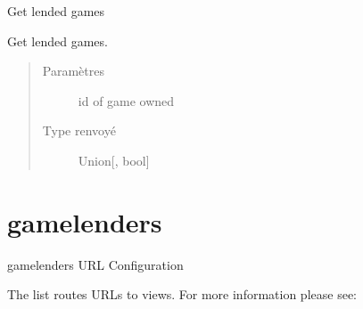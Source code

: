 \documentclass[letterpaper,10pt,french]{sphinxmanual}
\begin{document}
\label{\detokenize{library:module-library.templatetags.get_lended}}
Get lended games

\begin{fulllineitems}
\label{\detokenize{library:library.templatetags.get_lended.get_lended}}
Get lended games.
\begin{quote}\begin{description}
\item[{Paramètres}] \leavevmode
{} \textendash{} id of game owned

\item[{Type renvoyé}] \leavevmode
Union{[}{\hyperref[\detokenize{library:library.models.LendedGame}]{}}, bool{]}

\end{description}\end{quote}

\end{fulllineitems}



\chapter{gamelenders}
\label{\detokenize{gamelenders:module-gamelenders.urls}}\label{\detokenize{gamelenders:gamelenders}}\label{\detokenize{gamelenders::doc}}
gamelenders URL Configuration
\begin{description}
\item[{The  list routes URLs to views. For more information please see:}] \leavevmode
{}

\end{description}
\end{document}
